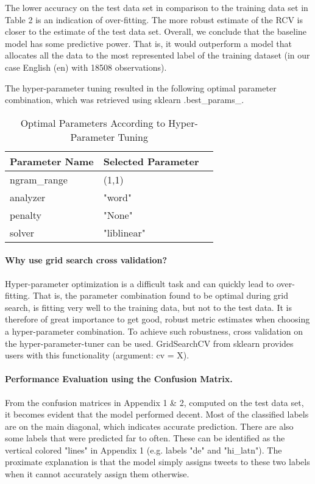 \documentclass[fleqn,10pt]{SelfArx} %
\begin{document}
The lower accuracy on the test data set in comparison to the training data set in Table 2 is an indication of over-fitting. The more robust estimate of the RCV is closer to the estimate of the test data set. Overall, we conclude that the baseline model has some predictive power. That is, it would outperform a model that allocates all the data to the most represented label of the training dataset (in our case English (en) with 18508 observations). 

The hyper-parameter tuning resulted in the following optimal parameter combination, which was retrieved using sklearn .best\_params\_.

\begin{table}[hbt]
	\caption{Optimal Parameters According to Hyper-Parameter Tuning}
	\centering
	\begin{tabular}{llr}
		\toprule
		 Parameter Name &  Selected Parameter\\
		\midrule
		ngram\_range & (1,1) \\
		analyzer & "word" \\
		penalty & "None" \\
		solver & "liblinear" \\
		\bottomrule
	\end{tabular}
	\label{tab:label}
\end{table}

\paragraph{Why use grid search cross validation?} Hyper-parameter optimization is a difficult task and can quickly lead to over-fitting. That is, the parameter combination found to be optimal during grid search, is fitting very well to the training data, but not to the test data. It is therefore of great importance to get good, robust metric estimates when choosing a hyper-parameter combination. To achieve such robustness, cross validation on the hyper-parameter-tuner can be used. GridSearchCV from sklearn provides users with this functionality (argument: cv = X). 

\paragraph{Performance Evaluation using the Confusion Matrix.} From the confusion matrices in Appendix 1 \& 2, computed on the test data set, it becomes evident that the model performed decent. Most of the classified labels are on the main diagonal, which indicates accurate prediction. There are also some labels that were predicted far to often. These can be identified as the vertical colored "lines" in Appendix 1 (e.g. labels "de" and "hi\_latn"). The proximate explanation is that the model simply assigns tweets to these two labels when it cannot accurately assign them otherwise.
\end{document}
